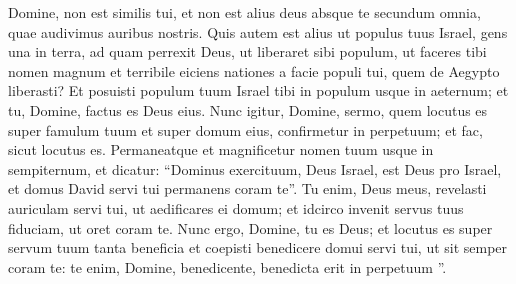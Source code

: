 \begin{biblechapter}
\begin{biblechapter}
\begin{biblechapter}
\begin{biblechapter}
\begin{biblechapter}
\begin{biblechapter}
\begin{biblechapter}
\begin{biblechapter}
\begin{biblechapter}
\begin{biblechapter}
\begin{biblechapter}
\begin{biblechapter}
\begin{biblechapter}
\begin{biblechapter}
\begin{biblechapter}
\begin{biblechapter}
\begin{biblechapter}
\verse Domine, non est similis tui, et non est alius deus absque te secundum omnia, quae audivimus auribus nostris. 
\verse Quis autem est alius ut populus tuus Israel, gens una in terra, ad quam perrexit Deus, ut liberaret sibi populum, ut faceres tibi nomen magnum et terribile eiciens nationes a facie populi tui, quem de Aegypto liberasti? 
\verse Et posuisti populum tuum Israel tibi in populum usque in aeternum; et tu, Domine, factus es Deus eius. 
\verse Nunc igitur, Domine, sermo, quem locutus es super famulum tuum et super domum eius, confirmetur in perpetuum; et fac, sicut locutus es. 
\verse Permaneatque et magnificetur nomen tuum usque in sempiternum, et dicatur: “Dominus exercituum, Deus Israel, est Deus pro Israel, et domus David servi tui permanens coram te”. 
\verse Tu enim, Deus meus, revelasti auriculam servi tui, ut aedificares ei domum; et idcirco invenit servus tuus fiduciam, ut oret coram te. 
\verse Nunc ergo, Domine, tu es Deus; et locutus es super servum tuum tanta beneficia 
\verse et coepisti benedicere domui servi tui, ut sit semper coram te: te enim, Domine, benedicente, benedicta erit in perpetuum ”.
 

\end{biblechapter}
\end{biblechapter}
\end{biblechapter}
\end{biblechapter}
\end{biblechapter}
\end{biblechapter}
\end{biblechapter}
\end{biblechapter}
\end{biblechapter}
\end{biblechapter}
\end{biblechapter}
\end{biblechapter}
\end{biblechapter}
\end{biblechapter}
\end{biblechapter}
\end{biblechapter}
\end{biblechapter}
